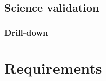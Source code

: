 \documentclass[DM,authoryear,toc,lsstdraft]{lsstdoc}
\begin{document}
\subsection{Science validation}

\subsubsection{Drill-down}
\label{sec:requests:drill}


\section{Requirements}
\label{sec:req}

\printglossary[style=index]


\end{document}
